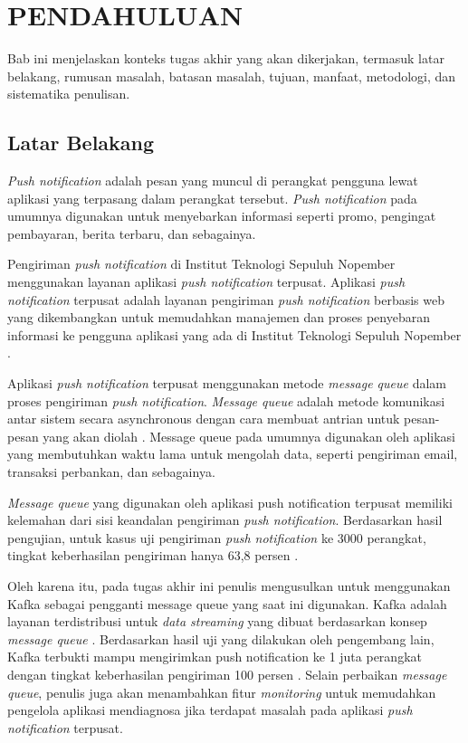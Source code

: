 \vspace{0ex}
\chapter {PENDAHULUAN}
\par Bab ini menjelaskan konteks tugas akhir yang akan dikerjakan, termasuk latar belakang, rumusan masalah, batasan masalah, tujuan, manfaat, metodologi, dan sistematika penulisan.

\section{Latar Belakang}
\par \textit{Push notification} adalah pesan yang muncul di perangkat pengguna lewat aplikasi yang terpasang dalam perangkat tersebut. \textit{Push notification} pada umumnya digunakan untuk menyebarkan informasi seperti promo, pengingat pembayaran, berita terbaru, dan sebagainya.
\par Pengiriman \textit{push notification} di Institut Teknologi Sepuluh Nopember menggunakan layanan aplikasi \textit{push notification} terpusat. Aplikasi \textit{push notification} terpusat adalah layanan pengiriman \textit{push notification} berbasis web yang dikembangkan untuk memudahkan manajemen dan proses penyebaran informasi ke pengguna aplikasi yang ada di Institut Teknologi Sepuluh Nopember \cite{application-thesis}.
\par Aplikasi \textit{push notification} terpusat menggunakan metode \textit{message queue} dalam proses pengiriman \textit{push notification}. \textit{Message queue} adalah metode komunikasi antar sistem secara asynchronous dengan cara membuat antrian untuk pesan-pesan yang akan diolah \cite{message-queue-online}. Message queue pada umumnya digunakan oleh aplikasi yang membutuhkan waktu lama untuk mengolah data, seperti pengiriman email, transaksi perbankan, dan sebagainya.
\par \textit{Message queue} yang digunakan oleh aplikasi push notification terpusat memiliki kelemahan dari sisi keandalan pengiriman \textit{push notification}. Berdasarkan hasil pengujian, untuk kasus uji pengiriman \textit{push notification} ke 3000 perangkat, tingkat keberhasilan pengiriman hanya 63,8 persen \cite{application-thesis}.
\par Oleh karena itu, pada tugas akhir ini penulis mengusulkan untuk menggunakan Kafka sebagai pengganti message queue yang saat ini digunakan. Kafka adalah layanan terdistribusi untuk \textit{data streaming} yang dibuat berdasarkan konsep \textit{message queue} \cite{kafka-online}. Berdasarkan hasil uji yang dilakukan oleh pengembang lain, Kafka terbukti mampu mengirimkan push notification ke 1 juta perangkat dengan tingkat keberhasilan pengiriman 100 persen \cite{prototype-article}. Selain perbaikan \textit{message queue}, penulis juga akan menambahkan fitur \textit{monitoring} untuk memudahkan pengelola aplikasi mendiagnosa jika terdapat masalah pada aplikasi \textit{push notification} terpusat.

